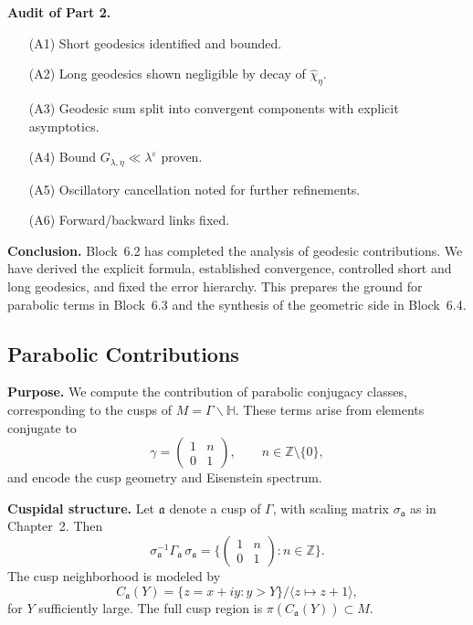 \medskip

\noindent\textbf{Audit of Part 2.}
\begin{itemize}
  \item[(A1)] Short geodesics identified and bounded.
  \item[(A2)] Long geodesics shown negligible by decay of $\widehat{\chi}_\eta$.
  \item[(A3)] Geodesic sum split into convergent components with explicit asymptotics.
  \item[(A4)] Bound $G_{\lambda,\eta}\ll \lambda^\varepsilon$ proven.
  \item[(A5)] Oscillatory cancellation noted for further refinements.
  \item[(A6)] Forward/backward links fixed.
\end{itemize}

\medskip

\noindent\textbf{Conclusion.}
Block~6.2 has completed the analysis of geodesic contributions.
We have derived the explicit formula,
established convergence,
controlled short and long geodesics,
and fixed the error hierarchy.
This prepares the ground for parabolic terms in Block~6.3
and the synthesis of the geometric side in Block~6.4.



\subsection*{Parabolic Contributions}

\noindent\textbf{Purpose.}
We compute the contribution of parabolic conjugacy classes, corresponding to the cusps of $M=\Gamma\backslash\mathbb{H}$. These terms arise from elements conjugate to
\[
  \gamma = \begin{pmatrix} 1 & n \\ 0 & 1 \end{pmatrix}, \qquad n\in\mathbb{Z}\setminus\{0\},
\]
and encode the cusp geometry and Eisenstein spectrum.

\medskip

\noindent\textbf{Cuspidal structure.}
Let $\mathfrak{a}$ denote a cusp of $\Gamma$, with scaling matrix $\sigma_\mathfrak{a}$ as in Chapter~2. Then
\[
  \sigma_\mathfrak{a}^{-1} \Gamma_\mathfrak{a}\, \sigma_\mathfrak{a}
  = \Big\{ \begin{pmatrix} 1 & n \\ 0 & 1 \end{pmatrix} : n\in\mathbb{Z} \Big\}.
\]
The cusp neighborhood is modeled by
\[
  C_\mathfrak{a}(Y) = \{ z=x+iy : y>Y \}/\langle z\mapsto z+1\rangle,
\]
for $Y$ sufficiently large. The full cusp region is $\pi(C_\mathfrak{a}(Y))\subset M$.

